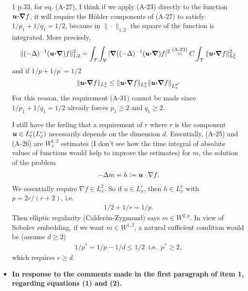 \documentclass[amsa]{article}
\begin{document}
\begin{itemize}
\item[1]  p.33, for eq. (A-27), I think if we apply (A-23) directly to
the function $\boldsymbol{u}\mbox{\boldmath${\cdot}$}\mbox{\boldmath${\nabla}$} f$, it will require the H{\"o}lder
components of (A-27) to satisfy $1/p_1+1/q_1=1/2$, because in
$\|\cdot\|_{1,2}$ the square of the function is integrated. More precisely,
%
\begin{align}
  \|(-\Delta)^{-1}(\boldsymbol{u}\mbox{\boldmath${\cdot}$}\mbox{\boldmath${\nabla}$}) f\|^2_{1,2}
  =\int_{\mathcal{T}}\int_{\mathcal{V}}|\mbox{\boldmath${\nabla}$}((-\Delta)^{-1}(\boldsymbol{u}\mbox{\boldmath${\cdot}$}\mbox{\boldmath${\nabla}$})f|^2
  \stackrel{\text{(A-23)}}{=}
  C\int_{\mathcal{T}}\|\boldsymbol{u}\mbox{\boldmath${\cdot}$}\mbox{\boldmath${\nabla}$} f\|^2_{L^2_x}
\end{align}
%
and if $1/p+1/p^\prime=1/2$
%
\begin{align}
  \|\boldsymbol{u}\mbox{\boldmath${\cdot}$}\mbox{\boldmath${\nabla}$} f\|_{L^2_x}
  \leq \|\boldsymbol{u}\mbox{\boldmath${\cdot}$}\mbox{\boldmath${\nabla}$} f\|_{L^p_x}\|\boldsymbol{u}\mbox{\boldmath${\cdot}$}\mbox{\boldmath${\nabla}$} f\|_{L^{p^\prime}_x}
\end{align}
%
For this reason, the requirement (A-31) cannot be made since
$1/p_1+1/q_1=1/2$ already forces $p_1\geq2$ and $q_1\geq2$.



I still have the feeling that a requirement of $r$ where $r$ is the
component $\boldsymbol{u}\in L^r_t(L^r_x)$ necessarily depends on the dimension
$d$. Essentially, (A-25) and (A-26) are $W_x^{1,2}$ estimates (I don’t
see how the time integral of absolute values of functions would help
to improve the estimates) for $m$, the solution of the problem
%
\begin{align}
  -\Delta m = h:= \boldsymbol{u}\cdot\nabla f.
\end{align}
%
We essentially require $\nabla f\in L_x^2$. So if $u\in L^r_x$, then $h\in L^p_x$
with $p=2r/(r+2)$, i.e.
%
\begin{align}
  1/2+1/r=1/p.
\end{align}
%
Then elliptic regularity (Calder{\'o}n-Zygmund) says $m\in W^{2,p}$. In
view of Sobolev embedding, if we want $m\in W^{1,2}$, a natural
sufficient condition would be (assume $d\geq2$)
%
\begin{align}
  1/p^*=1/p-1/d\leq1/2 ~\text{ i.e. }~ p^*\geq2,
\end{align}
%
which requires $r\geq d$.
%


\item \textbf{In response to the comments made in the first paragraph of item
  1, regarding equations (1) and (2).}


\end{itemize}
\end{document}
